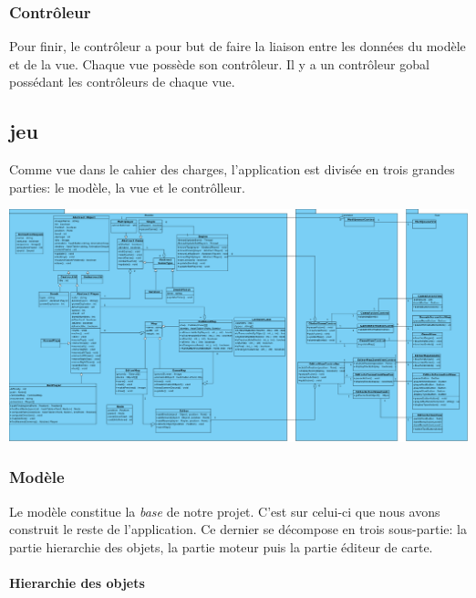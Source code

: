 	\subsubsection*{Contrôleur}
		
		Pour finir, le contrôleur a pour but de faire la liaison entre les 
		données du modèle et de la vue.
		Chaque vue possède son contrôleur.
		Il y a un contrôleur gobal possédant les contrôleurs de chaque vue.
			

	\subsection{jeu}
	
	Comme vue dans le cahier des charges, l'application est divisée en 
	trois grandes parties: le modèle, la vue et le contrôlleur.
	
	\begin{center}
		\includegraphics[scale=0.41, angle=90]{./Analyse/Img/BomberblocDiagramme.eps}
	\end{center}
	
	\subsubsection{Modèle}
	
		Le modèle constitue la \textit{base} de notre projet.
		C'est sur celui-ci que nous avons construit le reste de l'application.
		Ce dernier se décompose en trois sous-partie: la partie hierarchie des objets, la partie moteur puis la partie éditeur de carte.\\
		
	\paragraph{Hierarchie des objets \\}
	
